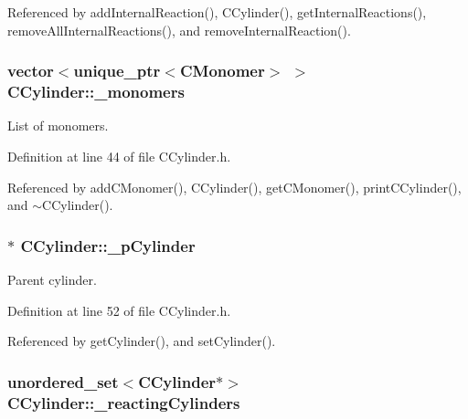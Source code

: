 Referenced by add\+Internal\+Reaction(), C\+Cylinder(), get\+Internal\+Reactions(), remove\+All\+Internal\+Reactions(), and remove\+Internal\+Reaction().

\hypertarget{classCCylinder_a2583ee1b23a42501ece73a2a35d92a31}{
\subsubsection[{\+\_\+monomers}]{\setlength{\rightskip}{0pt plus 5cm}vector$<$unique\+\_\+ptr$<${\bf C\+Monomer}$>$ $>$ C\+Cylinder\+::\+\_\+monomers\hspace{0.3cm}{\ttfamily [private]}}}\label{classCCylinder_a2583ee1b23a42501ece73a2a35d92a31}


List of monomers. 



Definition at line 44 of file C\+Cylinder.\+h.



Referenced by add\+C\+Monomer(), C\+Cylinder(), get\+C\+Monomer(), print\+C\+Cylinder(), and $\sim$\+C\+Cylinder().

\hypertarget{classCCylinder_a4439d9b805e3e206fd495540aa975346}{
\subsubsection[{\+\_\+p\+Cylinder}]{$\ast$ C\+Cylinder\+::\+\_\+p\+Cylinder\hspace{0.3cm}{\ttfamily [private]}}}\label{classCCylinder_a4439d9b805e3e206fd495540aa975346}


Parent cylinder. 



Definition at line 52 of file C\+Cylinder.\+h.



Referenced by get\+Cylinder(), and set\+Cylinder().

\hypertarget{classCCylinder_afdf5de084ef7692b8ee75b078eca384f}{
\subsubsection[{\+\_\+reacting\+Cylinders}]{\setlength{\rightskip}{0pt plus 5cm}unordered\+\_\+set$<${\bf C\+Cylinder}$\ast$$>$ C\+Cylinder\+::\+\_\+reacting\+Cylinders\hspace{0.3cm}{\ttfamily [private]}}}\label{classCCylinder_afdf5de084ef7692b8ee75b078eca384f}


